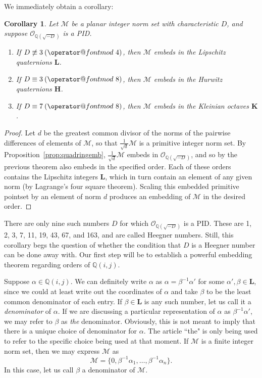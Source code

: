 \documentclass[10pt]{amsart}
\makeatletter
\newcommand{\M}{\mathcal{M}}
\newcommand{\Q}{\mathbb{Q}}
\renewcommand{\L}{\mathbf{L}}
\newcommand{\HH}{\mathbf{H}}
\newcommand{\K}{\mathbf{K}}
\newcommand{\thering}{\mathcal{O}_{\Q(\sqrt{-D})}}
\newtheorem{cor}[thm]{Corollary}
\DeclareRobustCommand{\pmod}{\@pmods}
\def\@pmods#1{\mkern4mu({\operator@font mod}\mkern 6mu#1)}
\makeatother
\begin{document}
\noindent
We immediately obtain a corollary:
\begin{cor}
\normalfont
Let $\M$ be a planar integer norm set with characteristic $D$, and suppose $\thering$ is a PID.
\begin{enumerate}
\item If $D \not \equiv 3 \pmod{4}$, then $\M$ embeds in the Lipschitz quaternions $\L$.
\item If $D \equiv 3 \pmod{8}$, then $\M$ embeds in the Hurwitz quaternions $\HH$.
\item If $D \equiv 7 \pmod{8}$, then $\M$ embeds in the Kleinian octaves $\K$.
\end{enumerate}
\end{cor}
\begin{proof}
Let $d$ be the greatest common divisor of the norms of the pairwise differences of elements of $\M$, so that $\frac{1}{\sqrt{d}}\M$ is a primitive integer norm set.  By Proposition~\ref{prop:quadringemb}, $\frac{1}{\sqrt{d}}\M$ embeds in $\thering$, and so by the previous theorem also embeds in the specified order.  Each of these orders contains the Lipschitz integers $\L$, which in turn contain an element of any given norm (by Lagrange's four square theorem).  Scaling this embedded primitive pointset by an element of norm $d$ produces an embedding of $\M$ in the desired order.
\end{proof}

There are only nine such numbers $D$ for which $\thering$ is a PID.  These are 1, 2, 3, 7, 11, 19, 43, 67, and 163, and are called Heegner numbers.  Still, this corollary begs the question of whether the condition that $D$ is a Heegner number can be done away with.  Our first step will be to establish a powerful embedding theorem regarding orders of $\Q(i,j)$.

Suppose $\alpha \in \Q(i,j)$.  We can definitely write $\alpha$ as $\alpha = \beta^{-1}\alpha'$ for some $\alpha', \beta \in \L$, since we could at least write out the coordinates of $\alpha$ and take $\beta$ to be the least common denominator of each entry.  If $\beta \in \L$ is any such number, let us call it a \emph{denominator} of $\alpha$.  If we are discussing a particular representation of $\alpha$ as $\beta^{-1} \alpha'$, we may refer to $\beta$ as \emph{the} denominator.  Obviously, this is not meant to imply that there is a unique choice of denominator for $\alpha$.  The article ``the" is only being used to refer to the specific choice being used at that moment.  If $\M$ is a finite integer norm set, then we may express $\M$ as
$$
\M = \{0, \beta^{-1}\alpha_1, \dots , \beta^{-1}\alpha_n\}.
$$
In this case, let us call $\beta$ a denominator of $\M$.
\end{document}
